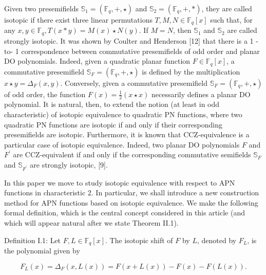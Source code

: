 \documentclass[10pt]{article}
\begin{document}
Given two presemifields $\mathbb{S}_{1}=\left(\mathbb{F}_{q},+, \star\right)$ and $\mathbb{S}_{2}= \left(\mathbb{F}_{q},+, *\right)$, they are called isotopic if there exist three linear permutations $T, M, N \in \mathbb{F}_{q}[x]$ such that, for any $x, y \in \mathbb{F}_{q}, T(x * y)=M(x) \star N(y)$. If $M=N$, then $\mathbb{S}_{1}$ and $\mathbb{S}_{2}$ are called strongly isotopic. It was shown by Coulter and Henderson [12] that there is a 1 -to- 1 correspondence between commutative presemifields of odd order and planar DO polynomials. Indeed, given a quadratic planar function $F \in \mathbb{F}_{q}[x]$, a commutative presemifield $\mathbb{S}_{F}=\left(\mathbb{F}_{q},+, \star\right)$ is defined by the multiplication $x \star y=\Delta_{F}(x, y)$. Conversely, given a commutative presemifield $\mathbb{S}_{F}=\left(\mathbb{F}_{q},+, \star\right)$ of odd order, the function $F(x)=\frac{1}{2}(x \star x)$ necessarily defines a planar DO polynomial. It is natural, then, to extend the notion (at least in odd characteristic) of isotopic equivalence to quadratic PN functions, where two quadratic PN functions are isotopic if and only if their corresponding presemifields are isotopic. Furthermore, it is known that CCZ-equivalence is a particular case of isotopic equivalence. Indeed, two planar DO polynomials $F$ and $F^{\prime}$ are CCZ-equivalent if and only if the corresponding commutative semifields $\mathbb{S}_{F}$ and $\mathbb{S}_{F^{\prime}}$ are strongly isotopic, [9].

In this paper we move to study isotopic equivalence with respect to APN functions in characteristic 2. In particular, we shall introduce a new construction method for APN functions based on isotopic equivalence. We make the following formal definition, which is the central concept considered in this article (and which will appear natural after we state Theorem II.1).

Definition I.1: Let $F, L \in \mathbb{F}_{q}[x]$. The isotopic shift of $F$ by $L$, denoted by $F_{L}$, is the polynomial given by


\begin{equation*}
F_{L}(x)=\Delta_{F}(x, L(x))=F(x+L(x))-F(x)-F(L(x)) . \tag{1}
\end{equation*}
\end{document}
